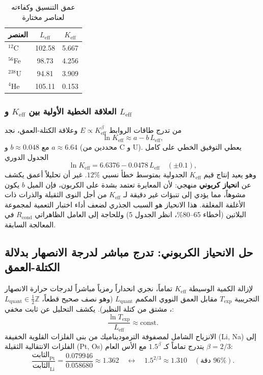 \documentclass[11pt,a4paper]{article}
\begin{document}
	\begin{table}[htbp]
		\centering
		\caption{عمق التنسيق وكفاءته لعناصر مختارة}
		\label{tab:L_Keff}
		\begin{tabular}{@{}lcc@{}}
			\toprule
			العنصر & \(L_{\mathrm{eff}}\) & \(K_{\mathrm{eff}}\) \\
			\midrule
			$^{12}$C & 102.58 & 5.667 \\
			$^{56}$Fe & 98.73 & 4.256 \\
			$^{238}$U & 94.81 & 3.909 \\
			$^{4}$He & 105.11 & 0.153 \\
			\bottomrule
		\end{tabular}
	\end{table}
	
	\subsubsection{العلاقة الخطية الأولية بين \(K_{\mathrm{eff}}\) و \(L_{\mathrm{eff}}\)}
	من تدرج طاقات الروابط \(E \propto K_{\mathrm{eff}}^{\beta}\) وعلاقة الكتلة-العمق، نجد
	\begin{equation}
		\ln K_{\mathrm{eff}} \approx a - b\,L_{\mathrm{eff}},
		\label{eq:lnK_vs_L_old}
	\end{equation}
	مع \(b \approx 0.048\) و \(a \approx 6.64\) (محددين من C و U).  
	يعطي التوفيق الخطي على كامل الجدول الدوري
	\[
	\ln K_{\mathrm{eff}} = 6.6376 - 0.0478\,L_{\mathrm{eff}} \quad (\pm 0.1),
	\]
	وهو يعيد إنتاج قيم \(K_{\mathrm{eff}}\) الجدولية بمتوسط خطأ نسبي \(12\%\).  
	غير أن تحليلاً أعمق يكشف عن \textbf{انحياز كربوني} منهجي: لأن المعايرة تعتمد بشدة على الكربون، فإن الميل \(b\) يكون مشوهاً، مما يؤدي إلى تنبؤات غير دقيقة لـ \(K_{\mathrm{eff}}\) من أجل النوى الثقيلة والذرات ذات الأغلفة المغلقة. هذا الانحياز هو السبب الجذري لضعف أداء اختبار التعمية لمجموعة البلاتين (أخطاء 65–80\%، انظر الجدول 5) وللحاجة إلى العامل الظاهراتي \(R_{\text{cond}}\) في المعالجة السابقة.
	
	\subsection{حل الانحياز الكربوني: تدرج مباشر لدرجة الانصهار بدلالة الكتلة-العمق}
	\label{subsec:direct_mass}
	
	لإزالة الكمية الوسيطة \(K_{\mathrm{eff}}\) تماماً، نجري انحداراً رمزياً مباشراً لدرجات حرارة الانصهار التجريبية \(T_{\mathrm{exp}}\) مقابل العمق النووي المكمم \(L_{\mathrm{quant}}\) (وهو نصف صحيح قطعاً، \(L_{\mathrm{quant}} \in \frac{1}{2}\mathbb{Z}\)، مشتق من كتلة النظير). يكشف التحليل عن ثابت مخفي:
	\[
	\frac{\ln T_{\mathrm{exp}}}{L_{\mathrm{eff}}}\approx \text{const}.
	\]
	الانزياح الشامل لمصفوفة الترموديناميك من بنى الفلزات القلوية الخفيفة (Li, Na) إلى الفلزات الانتقالية الثقيلة (Pt, Os) يتدرج تماماً كـ \(1.5^{\beta}\) مع الأس العام \(\beta = 2/3\):
	\[
	\frac{\text{الثابت}_{\mathrm{Pt}}}{\text{الثابت}_{\mathrm{Li}}}=\frac{0.079946}{0.058680}\approx 1.362 \quad \longleftrightarrow \quad 1.5^{2/3}\approx 1.310 \quad (\text{دقة } 96\%).
	\]
	
\end{document}
